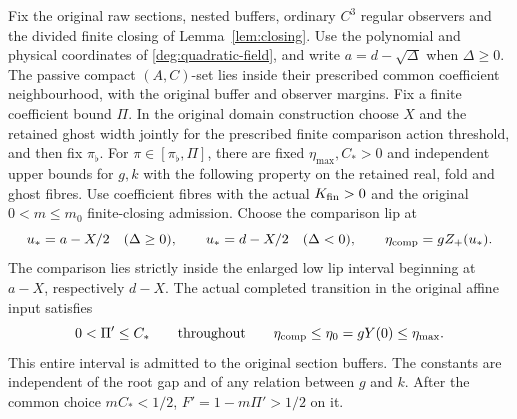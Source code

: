 \begin{lemma}
\label{deg:lem-positive-quadratic-paired-variation}
Fix the original raw sections, nested buffers, ordinary \(C^3\)
regular observers and the divided finite closing of
Lemma~\ref{lem:closing}.
Use the polynomial and physical coordinates of
\eqref{deg:quadratic-field}, and write \(a=d-\sqrt\Delta\) when
\(\Delta\ge0\). The passive compact
\((A,C)\)-set lies inside their prescribed common coefficient
neighbourhood, with the original buffer and observer margins.
Fix a finite coefficient bound \(\Pi\). In the original domain
construction choose \(X\) and the retained ghost width jointly for
the prescribed finite comparison action threshold, and then fix
\(\pi_\flat\). For \(\pi\in[\pi_\flat,\Pi]\), there are fixed
\(\eta_{\max},C_*>0\) and independent upper bounds for \(g,k\)
with the following property on the retained real, fold and ghost fibres.
Use coefficient fibres with the actual \(K_{\rm fin}>0\) and the
original \(0<m\le m_0\) finite-closing admission.
Choose the comparison lip at
\[
 u_* = a-X/2\quad(\Delta\ge0),\qquad
 u_* = d-X/2\quad(\Delta<0),
 \qquad \eta_{\rm comp}=gZ_+(u_*).
\]
The comparison lies strictly inside the enlarged low lip interval
beginning at \(a-X\), respectively \(d-X\). The actual completed
transition in the original affine input satisfies
\[
 0<\Pi'\le C_*
 \qquad\text{throughout}\qquad
 \eta_{\rm comp}\le\eta_0=gY(0)\le\eta_{\max}.
\]
This entire interval is admitted to the original section buffers.
The constants are independent of the root gap and of any relation
between \(g\) and \(k\). After the common choice \(mC_*<1/2\),
\(F'=1-m\Pi'>1/2\) on it.
\end{lemma}

